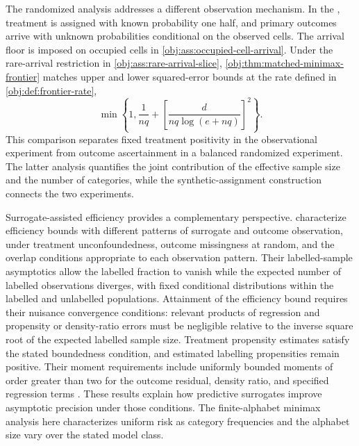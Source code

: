 The randomized analysis addresses a different observation mechanism. In the , treatment is assigned with known probability one half, and primary outcomes arrive with unknown probabilities conditional on the observed cells. The arrival floor  is imposed on occupied cells in \cref{obj:ass:occupied-cell-arrival}. Under the rare-arrival restriction in \cref{obj:ass:rare-arrival-slice}, \cref{obj:thm:matched-minimax-frontier} matches upper and lower squared-error bounds at the rate defined in \cref{obj:def:frontier-rate},
\[
\min\left\{1,\frac{1}{nq}
+\left[\frac{d}{nq\log(e+nq)}\right]^2\right\}.
\]
This comparison separates fixed treatment positivity in the observational experiment from outcome ascertainment in a balanced randomized experiment. The latter analysis quantifies the joint contribution of the effective sample size and the number of categories, while the synthetic-assignment construction connects the two experiments.

Surrogate-assisted efficiency provides a complementary perspective. \citet[Theorems 2.1--2.2 and 4.1--4.2]{KallusMao2025} characterize efficiency bounds with different patterns of surrogate and outcome observation, under treatment unconfoundedness, outcome missingness at random, and the overlap conditions appropriate to each observation pattern. Their labelled-sample asymptotics allow the labelled fraction to vanish while the expected number of labelled observations diverges, with fixed conditional distributions within the labelled and unlabelled populations. Attainment of the efficiency bound requires their nuisance convergence conditions: relevant products of regression and propensity or density-ratio errors must be negligible relative to the inverse square root of the expected labelled sample size. Treatment propensity estimates satisfy the stated boundedness condition, and estimated labelling propensities remain positive. Their moment requirements include uniformly bounded moments of order greater than two for the outcome residual, density ratio, and specified regression terms \citep[Assumption 7 and Appendix D.1, Assumption 9]{KallusMao2025}. These results explain how predictive surrogates improve asymptotic precision under those conditions. The finite-alphabet minimax analysis here characterizes uniform risk as category frequencies and the alphabet size vary over the stated model class.

